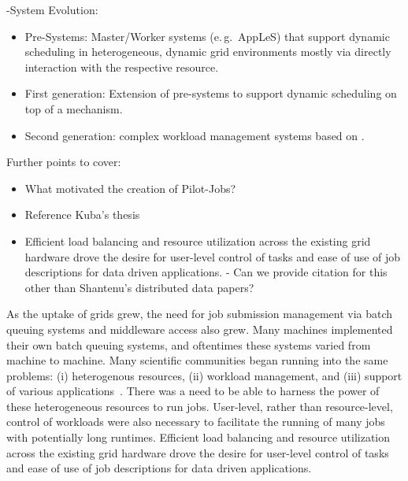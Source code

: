 \documentclass{sig-alternate}
\begin{document}

\pilotjob-System Evolution:
\begin{itemize}
    \item Pre-\pilotjob Systems: Master/Worker systems (e.\,g.\ AppLeS) that 
    support dynamic scheduling in heterogeneous, dynamic grid environments 
    mostly via directly interaction with the respective resource.
    \item First generation: Extension of pre-\pilot systems to support dynamic 
    scheduling on top of a \pilot mechanism.
    \item Second generation: complex workload management systems based on \pilots.
\end{itemize}

Further points to cover:
\begin{itemize}
\item What motivated the creation of Pilot-Jobs?
\item Reference Kuba's thesis
\item Efficient load balancing and resource utilization across the existing grid hardware drove the desire for user-level control of tasks and ease of use of job descriptions for data driven applications. - Can we provide citation for this other than Shantenu's distributed data papers?
\end{itemize}

As the uptake of grids grew, the need for job submission management
via batch queuing systems and middleware access also grew. Many
machines implemented their own batch queuing systems, and oftentimes
these systems varied from machine to machine. Many scientific
communities began running into the same problems: (i) heterogenous
resources, (ii) workload management, and (iii) support of various
applications~\cite{cern-slides}. There was a need to be able to
harness the power of these heterogeneous resources to run
jobs. User-level, rather than resource-level, control of workloads
were also necessary to facilitate the running of many jobs with
potentially long runtimes. 
Efficient load balancing and resource utilization across the existing
grid hardware  drove the desire for user-level control of tasks and ease
of use of job descriptions for data driven
applications. 
\end{document}
